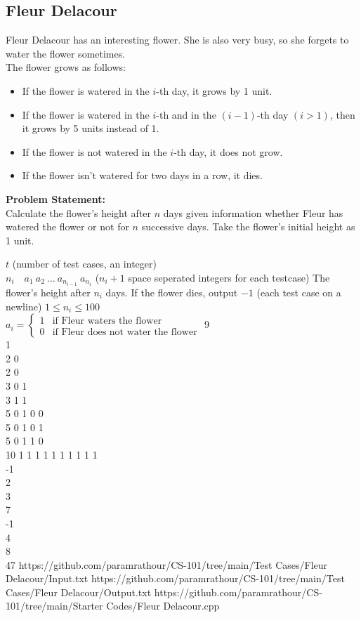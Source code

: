 \subsection{Fleur Delacour}
Fleur Delacour has an interesting flower. She is also very busy, so  she forgets to water the flower sometimes.\\
The flower grows as follows:
\begin{itemize}
\item If the flower is watered in the $i$-th day, it grows by 1 unit.
\item If the flower is watered in the $i$-th and in the $(i-1)$-th day $(i>1)$, then it grows by 5 units instead of 1.
\item If the flower is not watered in the $i$-th day, it does not grow.
\item If the flower isn't watered for two days in a row, it dies.
\end{itemize}
\textbf{Problem Statement:}\\
Calculate the flower's height after $n$ days given information whether Fleur has watered the flower or not for $n$ successive days. Take the flower's initial height as 1 unit.
\begin{testcasesMore}
	{$t$ \hfill(number of test cases, an integer)\\
	$n_i\quad a_{1}\ a_{2}\ \ldots\ a_{n_{i-1}}\ a_{n_i}$ \hfill($n_i+1$ space seperated integers for each testcase)}
	{The flower's height after $n_i$ days. If the flower dies, output $-1$ \hfill(each test case on a newline)}
	{$1 \leq n_i \leq 100$\\[0.5em]
	$
	a_i = \begin{cases} 
      1 & \text{if Fleur waters the flower}\\
      0 & \text{if Fleur does not water the flower}
   \end{cases}
	$}
	{9\\1\\2 0\\2 0\\3 0 1\\3 1 1\\5 0 1 0 0\\5 0 1 0 1\\5 0 1 1 0\\10 1 1 1 1 1 1 1 1 1}
	{1\\-1\\2\\3\\7\\-1\\4\\8\\47}
	{https://github.com/paramrathour/CS-101/tree/main/Test Cases/Fleur Delacour/Input.txt}
	{https://github.com/paramrathour/CS-101/tree/main/Test Cases/Fleur Delacour/Output.txt}
	{https://github.com/paramrathour/CS-101/tree/main/Starter Codes/Fleur Delacour.cpp}
\end{testcasesMore}
